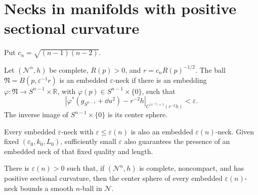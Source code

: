 \section{Necks in manifolds with positive sectional curvature}

Put \(c_n=\sqrt{(n-1)(n-2)}\).

\begin{definition}
\label{def:chow-iii-embedded-epsilon-neck}
Let \((\mathcal N^n,h)\) be complete, \(R(p)>0\), and
\(r=c_nR(p)^{-1/2}\).  The ball \(\mathfrak N=B(p,\varepsilon^{-1}r)\) is an
embedded \(\varepsilon\)-neck if there is an embedding
\(\varphi:\mathfrak N\to S^{n-1}\times\mathbb R\), with
\(\varphi(p)\in S^{n-1}\times\{0\}\), such that
\[
 \left|\varphi^*(g_{S^{n-1}}+\dd u^2)-r^{-2}h\right|_
 {C^{\lceil\varepsilon^{-1}\rceil+1}(r^{-2}h)}<\varepsilon.
\]
The inverse image of \(S^{n-1}\times\{0\}\) is its center sphere.
\end{definition}

\begin{remark}
\label{rem:chow-iii-neck-quality-comparison}
Every embedded \(\varepsilon\)-neck with
\(\varepsilon\le\varepsilon(n)\) is also an embedded
\(\varepsilon(n)\)-neck.  Given fixed \((\varepsilon_0,k_0,L_0)\), sufficiently
small \(\varepsilon\) also guarantees the presence of an embedded neck of
that fixed quality and length.
\end{remark}

\begin{lemma}
\label{lem:chow-iii-neck-center-bounds-ball}
There is \(\varepsilon(n)>0\) such that, if \((\mathcal N^n,h)\) is complete,
noncompact, and has positive sectional curvature, then the center sphere of
every embedded \(\varepsilon(n)\)-neck bounds a smooth \(n\)-ball in
\(\mathcal N\).
\end{lemma}

